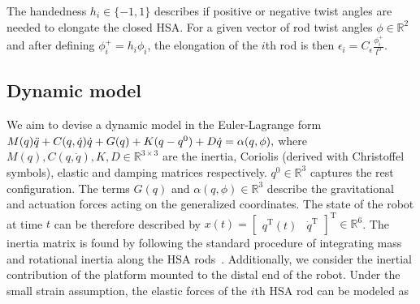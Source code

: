 The handedness $h_i \in \{-1, 1\}$ describes if positive or negative twist angles are needed to elongate the closed \gls{HSA}.
For a given vector of rod twist angles $\phi \in \mathbb{R}^2$ and after defining $\phi_{i}^+ = h_i \phi_i$, the elongation of the $i$th rod is then $\epsilon_i = C_\epsilon \frac{\phi_{i}^+}{l^0}$.


\subsection{Dynamic model}\label{sub:hsamodel:planar_hsa_robot_model:dynamics}
We aim to devise a dynamic model in the Euler-Lagrange form
$M(q) \Ddot{q} + C(q,\dot{q})\dot{q} + G(q) + K (q - q^0) + D \dot{q} = \alpha(q,\phi),$
where $M(q),C(q,\dot{q}),K,D \in \mathbb{R}^{3 \times 3}$ are the inertia, Coriolis (derived with Christoffel symbols), elastic and damping matrices respectively. $q^0 \in \mathbb{R}^3$ captures the rest configuration. The terms $G(q)$ and $\alpha(q,\phi) \in \mathbb{R}^3$ describe the gravitational and actuation forces acting on the generalized coordinates.
The state of the robot at time $t$ can be therefore described by $x(t) = \begin{bmatrix}
    q^\mathrm{T}(t) & \dot{q}^\mathrm{T}
\end{bmatrix}^\mathrm{T} \in \mathbb{R}^6$.
The inertia matrix is found by following the standard procedure of integrating mass and rotational inertia along the \gls{HSA} rods~\cite{della2023model}. Additionally, we consider the inertial contribution of the platform mounted to the distal end of the robot.
Under the small strain assumption, the elastic forces of the $i$th \gls{HSA} rod can be modeled as

